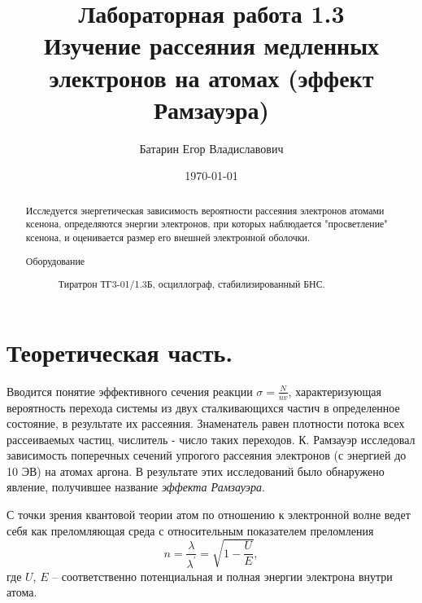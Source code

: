 \documentclass[%
 reprint,
 amsmath,amssymb,
 aps,
]{revtex4-2}
\begin{document}
\title{Лабораторная работа 1.3\\Изучение рассеяния медленных электронов на атомах (эффект Рамзауэра)}%



\author{Батарин Егор Владиславович}
%


\date{\today}%
             

\begin{abstract}
Исследуется энергетическая зависимость вероятности рассеяния электронов атомами ксенона, определяются энергии электронов, при которых наблюдается "просветление" ксенона, и оценивается размер его внешней электронной оболочки.  
\begin{description}
\item[Оборудование]
Тиратрон ТГ3-01/1.3Б, осциллограф, стабилизированный БНС.
\end{description}
\end{abstract}

\maketitle


\section{Теоретическая часть.}

Вводится понятие эффективного сечения реакции $\sigma = \frac{N}{nv}$, характеризующая вероятность перехода системы из двух сталкивающихся частич в определенное состояние, в результате их рассеяния. Знаменатель равен плотности потока всех рассеиваемых частиц, числитель - число таких переходов.
К. Рамзауэр исследовал зависимость поперечных сечений упрогого рассеяния электронов (с энергией до 10 ЭВ) на атомах аргона. В результате этих исследований было обнаружено явление, получившее название \textit{эффекта Рамзауэра}.

С точки зрения квантовой теории атом по отношению к электронной волне ведет себя как преломляющая среда с относительным показателем преломления
\begin{equation*}
n = \frac{\lambda}{\lambda^\prime} = \sqrt{1-\frac{U}{E}},
\end{equation*}
где $U$, $E$ -- соответственно потенциальная и полная энергии электрона внутри атома.
\end{document}
